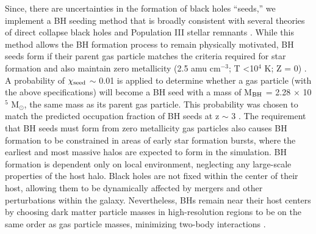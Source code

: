 \documentclass[12pt,headA,chapB]{fiskthesis}
\begin{document}
Since, there are uncertainties in the formation of black holes ``seeds,'' we implement a BH seeding method that is broadly consistent with several theories of direct collapse black holes \citep{Couchman1986, Abel2002, Bromm2004} and Population III stellar remnants \citep{Loeb1994, Eisenstein1995, Koushiappas2004, Begelman2006, Lodato2006}. While this method allows the BH formation process to remain physically motivated, BH seeds form if their parent gas particle matches the criteria required for star formation and also maintain zero metallicity (2.5 amu cm$^{-3}$; T \textless 10$^4$ K; Z = 0) \citep{Stinson2006}. A probability of $\chi_{\rm seed}$ $\sim$ 0.01 is applied to determine whether a gas particle (with the above specifications) will become a BH seed with a mass of M$_{\rm BH}$ = 2.28 $\times$ 10$^5$ M$_{\odot}$, the same mass as its parent gas particle. This probability was chosen to match the predicted occupation fraction of BH seeds at z $\sim$ 3 \citep{Volonteri2008}.
The requirement that BH seeds must form from zero metallicity gas particles also causes BH formation to be constrained in areas of early star formation bursts, where the earliest and most massive halos are expected to form in the simulation. BH formation is dependent only on local environment, neglecting any large-scale properties of the host halo. Black holes are not fixed within the center of their host, allowing them to be dynamically affected by mergers and other perturbations within the galaxy. Nevertheless, BHs remain near their host centers by choosing dark matter particle masses in high-resolution regions to be on the same order as gas particle masses, minimizing two-body interactions \citep{Bellovary2011}.
\end{document}
